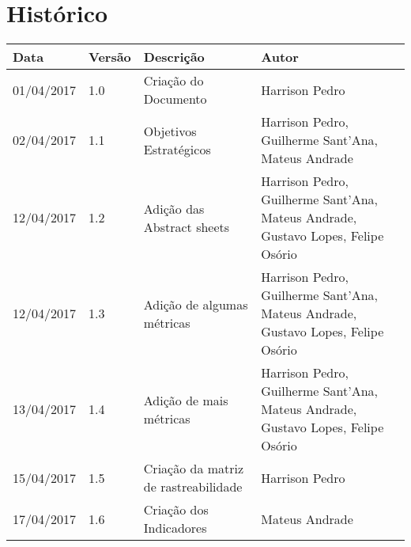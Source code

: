 \chapter{Histórico}

\begin{tabular}{ |p{3cm}|p{3cm}|p{3cm}|p{3cm}|  }
 \hline
 Data 		& 		Versão & 		Descrição 			& 		Autor\\
 \hline\hline
 01/04/2017 & 		1.0    &		Criação do Documento &   	Harrison Pedro \\ 
 \hline
 02/04/2017 & 		1.1    &		Objetivos Estratégicos &   	Harrison Pedro, Guilherme Sant'Ana, Mateus Andrade \\ 
 \hline
 12/04/2017 & 		1.2    &		Adição das Abstract sheets  &   	Harrison Pedro, Guilherme Sant'Ana, Mateus Andrade, Gustavo Lopes, Felipe Osório \\ 
 \hline
 12/04/2017 & 		1.3    &		Adição de algumas métricas  &   	Harrison Pedro, Guilherme Sant'Ana, Mateus Andrade, Gustavo Lopes, Felipe Osório \\ 
 \hline
 13/04/2017 & 		1.4    &		Adição de mais métricas  &   	Harrison Pedro, Guilherme Sant'Ana, Mateus Andrade, Gustavo Lopes, Felipe Osório \\ 
 \hline
 15/04/2017 & 		1.5    &		Criação da matriz de rastreabilidade  &   	Harrison Pedro \\ 
 \hline
 17/04/2017 &       1.6    &        Criação dos Indicadores  &     Mateus Andrade \\
 \hline
\end{tabular}

